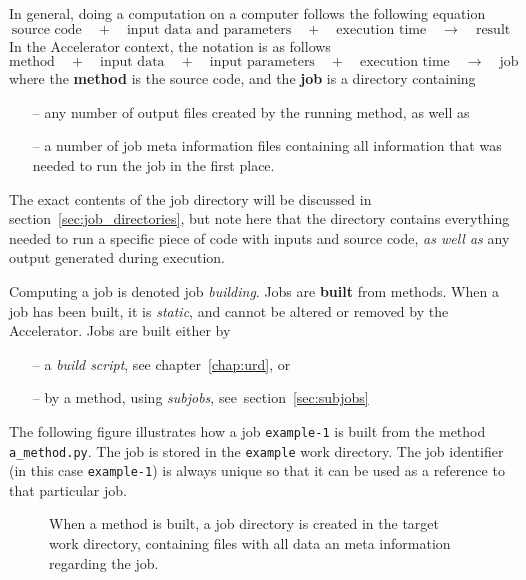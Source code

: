 In general, doing a computation on a computer follows the following
equation
\[
  \text{source code} \quad+\quad \text{input data and parameters}
  \quad+\quad \text{execution time} \quad\rightarrow\quad
  \text{result}
\]
In the Accelerator context, the notation is as follows
\[
  \text{method} \quad+\quad \text{input data} \quad+\quad \text{input
    parameters} \quad+\quad \text{execution time}
  \quad\rightarrow\quad \text{job}
\]
where the \textbf{method} is the source code, and the \textbf{job} is
a directory containing
\begin{itemize}
\item[--] any number of output files created by the running method, as well as
\item[--] a number of job meta information files containing all
  information that was needed to run the job in the first place.
\end{itemize}
The exact contents of the job directory will be discussed in
section~\ref{sec:job_directories}, but note here that the directory
contains everything needed to run a specific piece of code with inputs
and source code, \textsl{as well as} any output generated during
execution.

Computing a job is denoted job \textsl{building}.
Jobs are \textbf{built} from methods.  When a job has been built, it
is \textsl{static}, and cannot be altered or removed by the
Accelerator.  Jobs are built either by
\begin{itemize}
\item[--] a \textsl{build script}, see chapter~\ref{chap:urd}, or
\item[--] by a method, using \textsl{subjobs}, see~section~\ref{sec:subjobs}
\end{itemize}
The following figure illustrates how a job \texttt{example-1} is
built from the method \texttt{a\_method.py}.  The job is stored in the
\texttt{example} work directory.  The job identifier (in this case
\texttt{example-1}) is always unique so that it can be used as a
reference to that particular job.
\begin{figure}[h!]
  \begin{center}
    \hspace{2cm}
    \label{fig:method}
  \end{center}
  \caption{When a method is built, a job directory is created in the
    target work directory, containing files with all data an meta
    information regarding the job.}
\end{figure}



